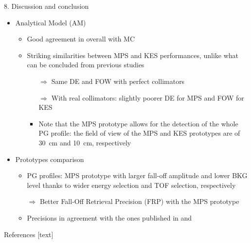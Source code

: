 \documentclass[final]{beamer} %
\begin{document}
\begin{frame}{}
\begin{columns}[t]
\begin{column}{0.49\textwidth}
	\begin{block}{8. Discussion and conclusion}	
		\begin{itemize}
			\item Analytical Model (AM)
			\begin{itemize}
				\item Good agreement in overall with MC
				\item Striking similarities between MPS and KES performances, unlike what can be concluded from previous studies \cite{Smeets2016,Lin2016,Park2019} 
				\begin{itemize}
					\item[$\Rightarrow$] Same DE and FOW with perfect collimators	
					\item[$\Rightarrow$] With real collimators: slightly poorer DE for MPS and FOW for KES 
					\item Note that the MPS prototype allows for the detection of the whole PG profile: the field of view of the MPS and KES prototypes are of 30~cm and 10~cm, respectively
				\end{itemize}			
			\end{itemize}

			\item Prototypes comparison
			\begin{itemize}
				\item PG profiles: MPS prototype with larger fall-off amplitude and lower BKG level thanks to wider energy selection and TOF selection, respectively
				\item[$\Rightarrow$] Better Fall-Off Retrieval Precision (FRP) with the MPS	prototype
				\item Precisions in agreement with the ones published in \cite{Pinto2014} and \cite{Smeets2012}
			\end{itemize}			

		\end{itemize}

		
		
	\end{block}

		
	  \begin{block}{References}
	    \tiny
	    [text] 
%	    
	    
	    				


	  \end{block}		
		

	  
	  \vfill
	  
	\end{column}
	
\end{columns}

      
\end{frame}
\end{document}
